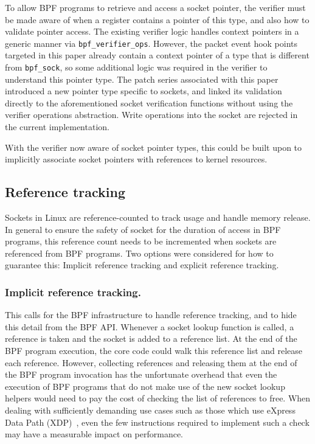 \documentclass[10pt,sigconf,authorversion]{lpc}
\begin{document}
To allow BPF programs to retrieve and access a socket pointer, the verifier
must be made aware of when a register contains a pointer of this type, and also
how to validate pointer access. The existing verifier logic handles context
pointers in a generic manner via \verb+bpf_verifier_ops+. However, the packet
event hook points targeted in this paper already contain a context pointer of a
type that is different from \verb+bpf_sock+, so some additional logic was
required in the verifier to understand this pointer type. The patch series
associated with this paper introduced a new pointer type specific to sockets,
and linked its validation directly to the aforementioned socket verification
functions without using the verifier operations abstraction. Write operations
into the socket are rejected in the current implementation.

With the verifier now aware of socket pointer types, this could be built upon
to implicitly associate socket pointers with references to kernel resources.

\subsection{Reference tracking}

Sockets in Linux are reference-counted to track usage and handle memory
release. In general to ensure the safety of socket for the duration of access
in BPF programs, this reference count needs to be incremented when sockets are
referenced from BPF programs. Two options were considered for how to guarantee
this: Implicit reference tracking and explicit reference tracking.


\subsubsection{Implicit reference tracking.}

This calls for the BPF infrastructure to handle reference tracking, and to hide
this detail from the BPF API. Whenever a socket lookup function is called, a
reference is taken and the socket is added to a reference list. At the end of
the BPF program execution, the core code could walk this reference list and
release each reference. However, collecting references and releasing them at
the end of the BPF program invocation has the unfortunate overhead that even
the execution of BPF programs that do not make use of the new socket lookup
helpers would need to pay the cost of checking the list of references to free.
When dealing with sufficiently demanding use cases such as those which use
eXpress Data Path (XDP)~\cite{xdp}, even the few instructions required to
implement such a check may have a measurable impact on performance.
\end{document}
